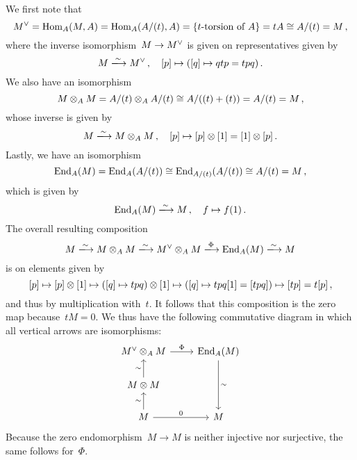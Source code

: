 We first note that
\[
        \dual{M}
  =     \Hom_A(M, A)
  =     \Hom_A( A/(t), A)
  =     \{ \text{\dash{$t$}{torsion} of~$A$} \}
  =     tA
  \cong A/(t)
  =     M \,,
\]
where the inverse isomorphism~$M \to M^\vee$ is given on representatives given by
\[
                  M
  \xlongto{\sim}  \dual{M} \,,
  \quad           [p]
  \mapsto         ( [q] \mapsto qtp = tpq ) \,.
\]
We also have an isomorphism
\[
        M \otimes_A M
  =     A/(t) \otimes_A A/(t)
  \cong A/( (t) + (t) )
  =     A/(t)
  =     M \,,
\]
whose inverse is given by
\[
                  M
  \xlongto{\sim}  M \tensor_A M \,,
  \quad           [p]
  \mapsto         [p] \tensor [1]
  =               [1] \tensor [p] \,.
\]
Lastly, we have an isomorphism
\[
        \operatorname{End}_A(M)
  =     \operatorname{End}_A(A/(t))
  \cong \operatorname{End}_{A/(t)}(A/(t))
  \cong A/(t)
  =     M \,,
\]
which is given by
\[
                  \End_A(M)
  \xlongto{\sim}  M \,,
  \quad           f
  \mapsto         f(1) \,.
\]
The overall resulting composition
\[
                  M
  \xlongto{\sim}  M \tensor_A M
  \xlongto{\sim}  \dual{M} \tensor_A M
  \xlongto{\Phi}  \End_A(M)
  \xlongto{\sim}  M
\]
is on elements given by
\[
          [p]
  \mapsto [p] \otimes [1]
  \mapsto ( [q] \mapsto tpq ) \otimes [1]
  \mapsto ( [q] \mapsto tpq [1] = [tpq] )
  \mapsto [tp]
  =       t [p] \,,
\]
and thus by multiplication with~$t$.
It follows that this composition is the zero map because~$t M = 0$.
We thus have the following commutative diagram in which all vertical arrows are isomorphisms:
\[
  \begin{tikzcd}
      \dual{M} \tensor_A M
      \arrow{r}[above]{\Phi}
    & \End_A(M)
      \arrow{dd}[right]{\sim}
    \\
      M \tensor M
      \arrow{u}[left]{\sim}
    & {}
    \\
      M
      \arrow{u}[left]{\sim}
      \arrow{r}[above]{0}
    & M
  \end{tikzcd}
\]
Because the zero endomorphism~$M \to M$ is neither injective nor surjective, the same follows for~$\Phi$.

















\subsection{}




